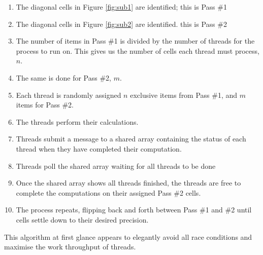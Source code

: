 \documentclass{article}
\begin{document}
\begin{enumerate}
    \item The diagonal cells in Figure \ref{fig:sub1} are identified; this is Pass \#1
    \item The diagonal cells in Figure \ref{fig:sub2} are identified. this is Pass \#2
    \item The number of items in Pass \#1 is divided by the number of threads for the process to run on. This gives us the number of cells each thread must process, $n$.
    \item The same is done for Pass \#2, $m$.
    \item Each thread is randomly assigned $n$ exclusive items from Pass \#1, and $m$ items for Pass \#2.
    \item The threads perform their calculations.
    \item Threads submit a message to a shared array containing the status of each thread when they have completed their computation.
    \item Threads poll the shared array waiting for all threads to be done
    \item Once the shared array shows all threads finished, the threads are free to complete the computations on their assigned Pass \#2 cells.
    \item The process repeats, flipping back and forth between Pass \#1 and \#2 until cells settle down to their desired precision.
\end{enumerate}
This algorithm at first glance appears to elegantly avoid all race conditions and maximise the work throughput of threads.
\end{document}
